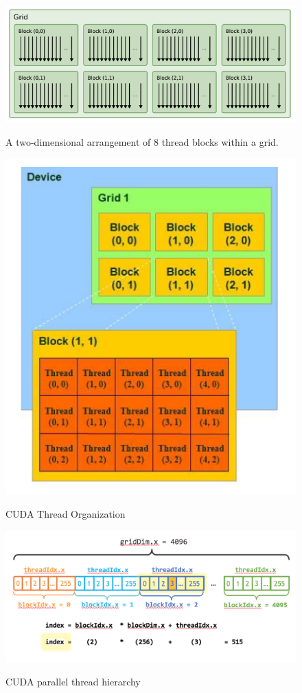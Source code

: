 \documentclass[Ingles]{ic-tese-v1}
\begin{document}
\begin{figure}[t]
	\centering
	\caption{A two-dimensional arrangement of 8 thread blocks within a grid.}
	\includegraphics[scale=0.75]{images/threadsblock.png}
	\label{fig:threadsblocks}
\end{figure}

\begin{figure}[h]
	\centering
	\caption{CUDA Thread Organization}
	\includegraphics[scale=0.45]{images/thread_organization.png}
	\label{fig:threadorganization}
\end{figure}
\begin{figure}[h!]
	\caption{CUDA parallel thread hierarchy}
	\centering
	\includegraphics[scale=0.50]{images/cuda_indexing.png}
	\label{fig:cudaindex}
\end{figure}
\end{document}
